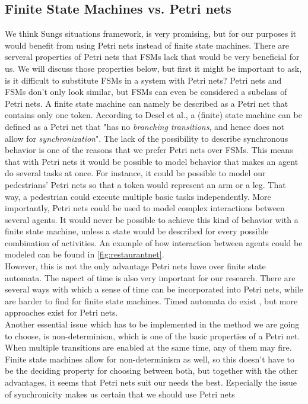 \documentclass[11pt, a4paper]{book}
\begin{document}
\subsection{Finite State Machines vs. Petri nets}
We think Sungs situations framework, is very promising, but for our purposes it would benefit from using Petri nets instead of finite state machines. There are serveral properties of Petri nets that FSMs lack that would be very beneficial for us. We will discuss those properties below, but first it might be important to ask, is it difficult to substitute FSMs in a system with Petri nets? Petri nets and FSMs don't only look similar, but FSMs can even be considered a subclass of Petri nets. A finite state machine can namely be described as a Petri net that contains only one token. According to Desel et al., a (finite) state machine can be defined as a Petri net that "has no \emph{branching transitions}, and hence does not allow for \emph{synchronization}". The lack of the possibility to describe synchronous behavior is one of the reasons that we prefer Petri nets over FSMs. This means that with Petri nets it would be possible to model behavior that makes an agent do several tasks at once. For instance, it could be possible to model our pedestrians' Petri nets so that a token would represent an arm or a leg. That way, a pedestrian could execute multiple basic tasks independently. More importantly, Petri nets could be used to model complex interactions between several agents. It would never be possible to achieve this kind of behavior with a finite state machine, unless a state would be described for every possible combination of activities.  An example of how interaction between agents could be modeled can be found in \ref{fig:restaurantnet}.\\
However, this is not the only advantage Petri nets have over finite state automata. The aspect of time is also very important for our research. There are several ways with which a sense of time can be incorporated into Petri nets, while are harder to find for finite state machines. Timed automata do exist \cite{alur1994theory}, but more approaches exist for Petri nets.\\
Another essential issue which has to be implemented in the method we are going to choose, is non-determinism, which is one of the basic properties of a Petri net. When multiple transitions are enabled at the same time, any of them may fire. Finite state machines allow for non-determinism as well, so this doesn't have to be the deciding property for choosing between both, but together with the other advantages, it seems that Petri nets suit our needs the best. Especially the issue of synchronicity makes us certain that we should use Petri nets
\end{document}
